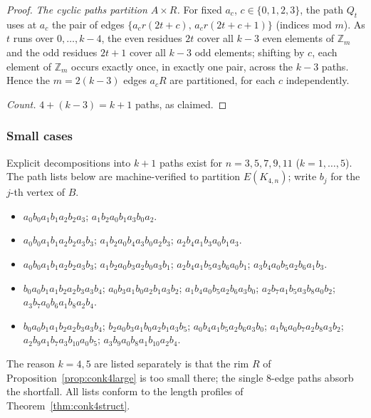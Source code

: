 \begin{proof}
\emph{The cyclic paths partition $A\times R$.}
For fixed $a_c$, $c\in\{0,1,2,3\}$, the path $Q_t$ uses at $a_c$ the pair
of edges $\{a_cr(2t+c),\,a_cr(2t+c+1)\}$ (indices mod $m$). As $t$ runs
over $0,\dots,k-4$, the even residues $2t$ cover all $k-3$ even elements
of $\mathbb{Z}_m$ and the odd residues $2t+1$ cover all $k-3$ odd
elements; shifting by $c$, each element of $\mathbb{Z}_m$ occurs exactly
once, in exactly one pair, across the $k-3$ paths. Hence the $m=2(k-3)$
edges $a_cR$ are partitioned, for each $c$ independently.

\emph{Count.} $4+(k-3)=k+1$ paths, as claimed.
\end{proof}

\subsubsection{Small cases}

\begin{proposition}\label{prop:conk4small}
Explicit decompositions into $k+1$ paths exist for $n=3,5,7,9,11$
($k=1,\dots,5$). The path lists below are machine-verified to partition
$E(K_{4,n})$; write $b_j$ for the $j$-th vertex of $B$.
\begingroup\sloppy
\begin{itemize}[leftmargin=1.5em]
\item[{$k=1$ ($n=3$; lengths $[6,6]$):}]
$a_0b_0a_1b_1a_2b_2a_3$;\quad
$a_1b_2a_0b_1a_3b_0a_2$.
\item[{$k=2$ ($n=5$; $[6,7,7]$):}]
$a_0b_0a_1b_1a_2b_2a_3b_3$;\quad
$a_1b_2a_0b_4a_3b_0a_2b_3$;\quad
$a_2b_4a_1b_3a_0b_1a_3$.
\item[{$k=3$ ($n=7$; $[7,7,7,7]$):}]
$a_0b_0a_1b_1a_2b_2a_3b_3$;\quad
$a_1b_2a_0b_3a_2b_0a_3b_1$;\quad
$a_2b_4a_1b_5a_3b_6a_0b_1$;\quad
$a_3b_4a_0b_5a_2b_6a_1b_3$.
\item[{$k=4$ ($n=9$; $[7,7,7,7,8]$):}]
$b_0a_0b_1a_1b_2a_2b_3a_3b_4$;\quad
$a_0b_3a_1b_0a_2b_1a_3b_2$;\quad
$a_1b_4a_0b_5a_2b_6a_3b_0$;\quad
$a_2b_7a_1b_5a_3b_8a_0b_2$;\quad
$a_3b_7a_0b_6a_1b_8a_2b_4$.
\item[{$k=5$ ($n=11$; $[7,7,7,7,8,8]$):}]
$b_0a_0b_1a_1b_2a_2b_3a_3b_4$;\quad
$b_2a_0b_3a_1b_0a_2b_1a_3b_5$;\quad
$a_0b_4a_1b_5a_2b_6a_3b_0$;\quad
$a_1b_6a_0b_7a_2b_8a_3b_2$;\quad
$a_2b_9a_1b_7a_3b_{10}a_0b_5$;\quad
$a_3b_9a_0b_8a_1b_{10}a_2b_4$.
\end{itemize}
\endgroup
The reason $k=4,5$ are listed separately is that the rim $R$ of
Proposition~\ref{prop:conk4large} is too small there; the single $8$-edge
paths absorb the shortfall. All lists conform to the length profiles of
Theorem~\ref{thm:conk4struct}.
\end{proposition}

